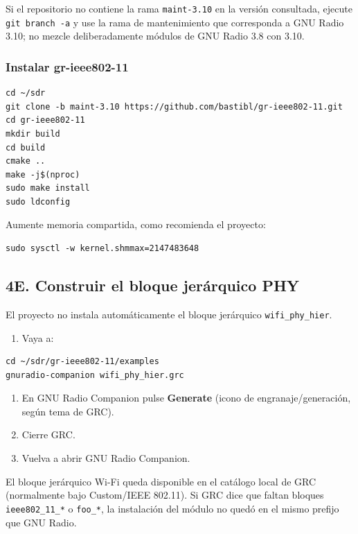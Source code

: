 Si el repositorio no contiene la rama \texttt{maint-3.10} en la versión consultada, ejecute \texttt{git branch -a} y use la rama de mantenimiento que corresponda a GNU Radio 3.10; no mezcle deliberadamente módulos de GNU Radio 3.8 con 3.10.

\subsubsection{Instalar gr-ieee802-11}

\begin{lstlisting}
cd ~/sdr
git clone -b maint-3.10 https://github.com/bastibl/gr-ieee802-11.git
cd gr-ieee802-11
mkdir build
cd build
cmake ..
make -j$(nproc)
sudo make install
sudo ldconfig
\end{lstlisting}

Aumente memoria compartida, como recomienda el proyecto:

\begin{lstlisting}
sudo sysctl -w kernel.shmmax=2147483648
\end{lstlisting}

\subsection{4E. Construir el bloque jerárquico PHY}

El proyecto no instala automáticamente el bloque jerárquico \texttt{wifi\_phy\_hier}.

\begin{enumerate}
    \item Vaya a:
\end{enumerate}

\begin{lstlisting}
cd ~/sdr/gr-ieee802-11/examples
gnuradio-companion wifi_phy_hier.grc
\end{lstlisting}

\begin{enumerate}[resume]
    \item En GNU Radio Companion pulse \textbf{Generate} (icono de engranaje/generación, según tema de GRC).
    \item Cierre GRC.
    \item Vuelva a abrir GNU Radio Companion.
\end{enumerate}

\begin{esperado}
El bloque jerárquico Wi-Fi queda disponible en el catálogo local de GRC (normalmente bajo Custom/IEEE 802.11). Si GRC dice que faltan bloques \texttt{ieee802\_11\_*} o \texttt{foo\_*}, la instalación del módulo no quedó en el mismo prefijo que GNU Radio.
\end{esperado}

